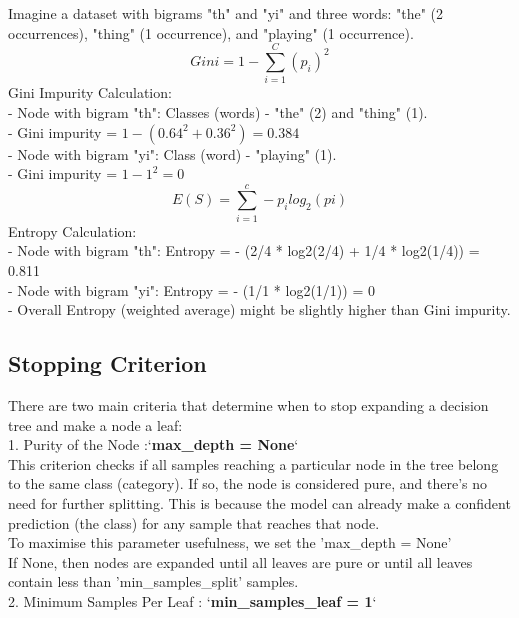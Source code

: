 \documentclass{article}
\begin{document}
Imagine a dataset with bigrams "th" and "yi" and three words: "the" (2 occurrences), "thing" (1 occurrence), and "playing" (1 occurrence).\\
\begin{equation}
  Gini = 1 - \sum_{i=1}^{C}(p_i)^{2}
\end{equation}
Gini Impurity Calculation:\\
  - Node with bigram "th": Classes (words) - "the" (2) and "thing" (1).\\
  - Gini impurity = $1 - (0.64^2 + 0.36^2) = 0.384$\\
  - Node with bigram "yi": Class (word) - "playing" (1).\\
  - Gini impurity = $1 - 1^2 = 0$\\
\begin{equation}
  E(S) = \sum_{i=1}^{c}-p_i log_2(pi)
\end{equation}
Entropy Calculation:\\
  - Node with bigram "th": Entropy = - (2/4 * log2(2/4) + 1/4 * log2(1/4)) = 0.811\\
  - Node with bigram "yi": Entropy = - (1/1 * log2(1/1)) = 0\\
  - Overall Entropy (weighted average) might be slightly higher than Gini impurity.
  \subsection{Stopping Criterion}
  There are two main criteria that determine when to stop expanding a decision tree and make a node a leaf:\\

1. Purity of the Node :`\textbf{max\_depth = None}`\\

This criterion checks if all samples reaching a particular node in the tree belong to the same class (category). If so, the node is considered pure, and there's no need for further splitting. This is because the model can already make a confident prediction (the class) for any sample that reaches that node.\\
To maximise this parameter usefulness, we set the 'max\_depth = None'\\
If None, then nodes are expanded until all leaves are pure or until all leaves contain less than 'min\_samples\_split' samples.\\

2. Minimum Samples Per Leaf : `\textbf{min\_samples\_leaf = 1}`\\
\end{document}
